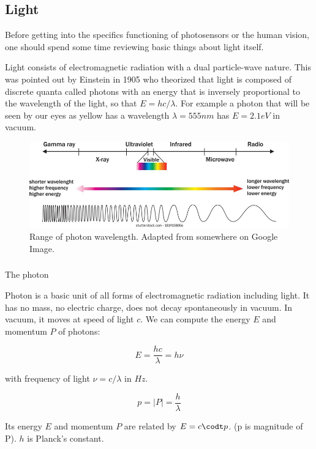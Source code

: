 \subsection{Light}

Before getting into the specifics functioning of photosensors or the human vision, one should spend some time reviewing basic things about light itself. 

Light consists of electromagnetic radiation with a dual particle-wave nature. This was pointed out by Einstein in 1905 who theorized that light is composed of discrete quanta called photons with an energy that is inversely proportional to the wavelength of the light, so that $E=hc/\lambda$.
For example a photon that will be seen by our eyes as yellow has a wavelength $\lambda=555nm$ has $E=2.1eV$ in vacuum.

\begin{figure}[H]
    \centering
    \includegraphics[width=0.7\linewidth]{../../Figures/Light.jpg}
    \caption{Range of photon wavelength. Adapted from somewhere on Google Image.}
    \label{fig:Light}
\end{figure}

\subsubsection{}{The photon}

Photon is a basic unit of all forms of electromagnetic radiation including light. It has no mass, no electric charge, does not decay spontaneously in vacuum. In vacuum, it moves at speed of light $c$. We can compute the energy $E$ and momentum $P$ of photons: 

\begin{equation}
    E = \frac{h c}{\lambda} = h \nu 
\end{equation}

with frequency of light $\nu = c/\lambda$ in $Hz$.

\begin{equation}
    p = |P| = \frac{h}{\lambda}
\end{equation}

Its energy $E$ and momentum $P$ are related by $E=c\codt p$. (p is magnitude of P). $h$ is Planck's constant. 

